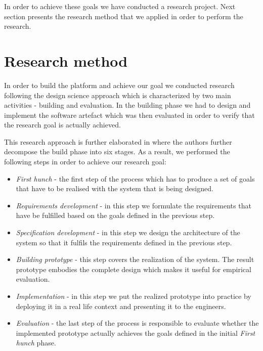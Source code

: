 In order to achieve these goals we have conducted a research project. Next section presents the research method that we applied in order to perform the research.

\section{Research method}

In order to build the platform and achieve our goal we conducted research following the design science approach \cite{hevner2004design} which is characterized by two main activities - building and evaluation. In the building phase we had to design and implement the software artefact which was then evaluated in order to verify that the research goal is actually achieved.

This research approach is further elaborated in \cite{verschuren2005evaluation} where the authors further decompose the build phase into six stages. As a result, we performed the following steps in order to achieve our research goal:

\begin{itemize}
	\item \textit{First hunch} - the first step of the process which has to produce a set of goals that have to be realised with the system that is being designed.
	
	\item \textit{Requirements development} - in this step we formulate the requirements that have be fulfilled based on the goals defined in the previous step.
	
	\item \textit{Specification development} - in this step we design the architecture of the system so that it fulfils the requirements defined in the previous step.
	
	\item \textit{Building prototype} - this step covers the realization of the system. The result prototype embodies the complete design which makes it useful for empirical evaluation.
	
	\item \textit{Implementation} - in this step we put the realized prototype into practice by deploying it in a real life context and presenting it to the engineers.
	
	\item \textit{Evaluation} - the last step of the process is responsible to evaluate whether the implemented prototype actually achieves the goals defined in the initial \textit{First hunch} phase. 
\end{itemize}  

